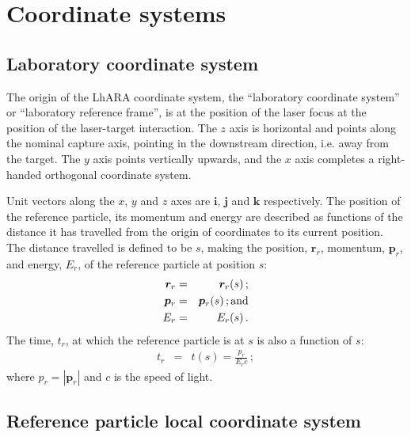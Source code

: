 \graphicspath{ {02-CoordinateSystems/Figures/} }

\section{Coordinate systems}

\subsection{Laboratory coordinate system}

The origin of the LhARA coordinate system, the ``laboratory coordinate
system'' or ``laboratory reference frame'', is at the position of the
laser focus at the position of the laser-target interaction.
The $z$ axis is horizontal and points along the nominal capture axis,
pointing in the downstream direction, i.e. away from the target.
The $y$ axis points vertically upwards, and the $x$ axis completes a
right-handed orthogonal coordinate system. 

Unit vectors along the $x$, $y$ and $z$ axes are $\bm{i}$, $\bm{j}$
and $\bm{k}$ respectively.
The position of the reference particle, its momentum and energy are
described as functions of the distance it has travelled from the origin
of coordinates to its current position.
The distance travelled is defined to be $s$, making the position,
$\bm{r}_r$, momentum, $\bm{p}_r$, and energy, $E_r$, of the
reference particle at position $s$:
\begin{eqnarray}
  \bm{r}_r & = & \bm{r}_r(s)\, ;           \nonumber \\
  \bm{p}_r & = & \bm{p}_r(s)\, {\rm ; and}           \\
       E_r & = &      E_r(s)\, .           \nonumber
\end{eqnarray}
The time, $t_r$, at which the reference particle is at $s$ is also a
function of $s$:
\begin{eqnarray}
        t_r  & = & t(s) = \frac{p_r}{E_r c}\, ; 
\end{eqnarray}
where $p_r=\left|\bm{p}_r\right|$ and $c$ is the speed of light.

\subsection{Reference particle local coordinate system}

